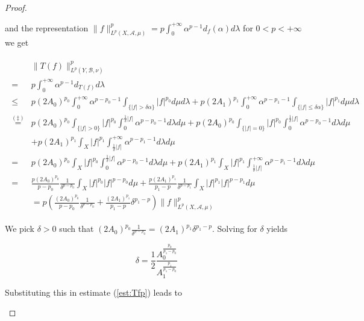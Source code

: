 \begin{proof}
\begin{enumerate}[label = \textbf{(\roman*.)}]
\begin{enumerate}[label = \textbf{\alph*.}]
		and the representation $\displaystyle \|f\|^p_{L^p(X,\mathcal{A},\mu)} = p \int_0^{+\infty} \alpha^{p-1}d_f(\alpha) d\lambda$ for $ 0 < p < + \infty$ we get

		\begin{gather}
			\begin{aligned}
				& \|T(f)\|^p_{L^p(Y,\mathcal{B},\nu)}\\ 
				= & p\int_0^{+\infty}\alpha^{p-1}d_{T(f)} d\lambda\\
				\leqslant & p(2A_0)^{p_0}\int_0^{+\infty}\alpha^{p-p_0-1} \int_{\{\vert f \vert > \delta \alpha\}} \vert f\vert^{p_0}d\mu d\lambda  + p(2A_1)^{p_1}\int_0^{+\infty}\alpha^{p-p_1-1} \int_{\{\vert f \vert \leqslant \delta \alpha\}} \vert f \vert^{p_1}d\mu d\lambda\\
				\overset{(\ddagger)}{=} & p(2A_0)^{p_0}\int_{\{\vert f \vert > 0\}} \vert f \vert^{p_0} \int_0^{\frac{1}{\delta}\vert f\vert}\alpha^{p-p_0-1} d\lambda d\mu + p(2A_0)^{p_0}\int_{\{\vert f \vert = 0\}} \vert f \vert^{p_0} \int_0^{\frac{1}{\delta}\vert f\vert}\alpha^{p-p_0-1} d\lambda d\mu\\
				& +p(2A_1)^{p_1}\int_X \vert f\vert^{p_1} \int_{\frac{1}{\delta}\vert f\vert}^{+\infty}\alpha^{p - p_1 - 1} d\lambda d\mu\\
				= & p(2A_0)^{p_0}\int_X \vert f \vert^{p_0} \int_0^{\frac{1}{\delta}\vert f\vert}\alpha^{p-p_0-1} d\lambda d\mu + p(2A_1)^{p_1}\int_X \vert f\vert^{p_1} \int_{\frac{1}{\delta}\vert f\vert}^{+\infty}\alpha^{p - p_1 - 1} d\lambda d\mu\\
				= & \frac{p(2A_0)^{p_0}}{p-p_0}\frac{1}{\delta^{p-p_0}}\int_X \vert f \vert^{p_0}\vert f \vert^{p-p_0} d\mu + \frac{p(2A_1)^{p_1}}{p_1-p}\frac{1}{\delta^{p-p_1}}\int_X \vert f \vert^{p_1} \vert f\vert^{p-p_1}d\mu\\
				&= p\left( \frac{(2A_0)^{p_0}}{p - p_0}\frac{1}{\delta^{p - p_0}} + \frac{(2A_1)^{p_1}}{p_1 - p}\delta^{p_1 - p} \right)\|f\|_{L^p(X,\mathcal{A},\mu)}^p
			\end{aligned}
			\label{est:Tfp}
		\end{gather}

		We pick $\delta > 0$ such that $(2A_0)^{p_0}\frac{1}{\delta^{p - p_0}} = (2A_1)^{p_1}\delta^{p_1 - p}$. Solving for $\delta$ yields 

		\begin{equation}
			\delta = \frac{1}{2} \frac{A_0^\frac{p_0}{p_1 - p_0}}{A_1^\frac{p_1}{p_1 - p_0}}
		\end{equation}

		Substituting this in estimate (\ref{est:Tfp}) leads to


\end{enumerate}
\end{enumerate}
\end{proof}
